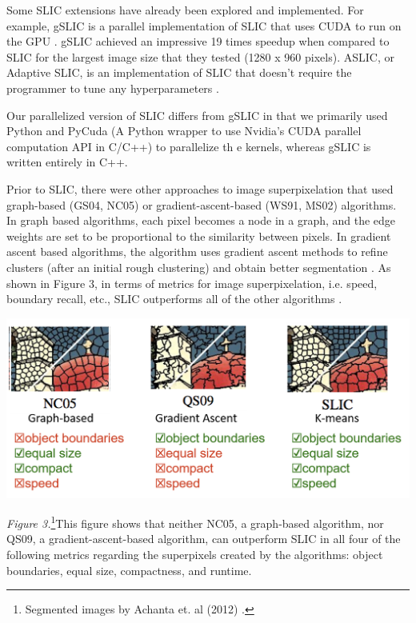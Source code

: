 \documentclass[11pt,twocolumn]{article}
\begin{document}
Some SLIC extensions have already been explored and implemented. For example, gSLIC is a parallel implementation of SLIC that uses CUDA to run on the GPU \cite{gslic}. gSLIC achieved an impressive 19 times speedup when compared to SLIC for the largest image size that they tested (1280 x 960 pixels). ASLIC, or Adaptive SLIC, is an implementation of SLIC that doesn't require the programmer to tune any hyperparameters \cite{slic2012}.

Our parallelized version of SLIC differs from gSLIC in that we primarily used Python and PyCuda (A Python wrapper to use Nvidia's CUDA parallel computation API in C/C++)  to parallelize th e kernels, whereas gSLIC is written entirely in C++. 

Prior to SLIC, there were other approaches to image superpixelation that used graph-based (GS04, NC05) or gradient-ascent-based (WS91, MS02) algorithms. In graph based algorithms, each pixel becomes a node in a graph, and the edge weights are set to be proportional to the similarity between pixels. In gradient ascent based algorithms, the algorithm uses gradient ascent methods to refine clusters (after an initial rough clustering) and obtain better segmentation \cite{slic}.  As shown in Figure 3, in terms of metrics for image superpixelation, i.e. speed, boundary recall, etc., SLIC outperforms all of the other algorithms \cite{slic}.\\

\begin{center}
\includegraphics[width = \linewidth]{slic_comp.png} \\
\end{center}
\textit{Figure 3.}\footnote{Segmented images by Achanta et. al (2012) \cite{slic2012}.}This figure shows that neither NC05, a graph-based algorithm, nor QS09, a gradient-ascent-based algorithm, can outperform SLIC in all four of the following metrics regarding the superpixels created by the algorithms: object boundaries, equal size, compactness, and runtime. \\
\end{document}

